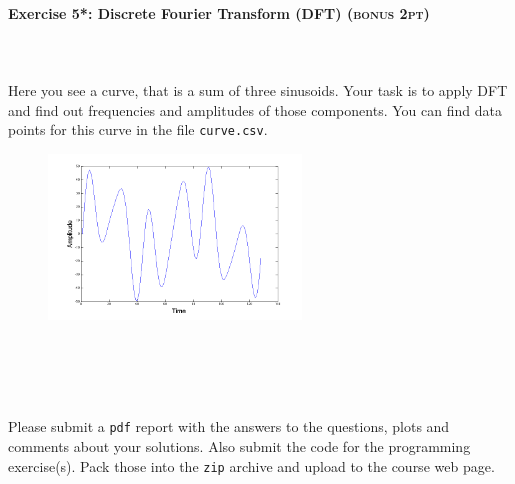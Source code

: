\documentclass[a4paper,11pt]{article}
\newenvironment{exercise}[3]{\paragraph{Exercise #1: #2 \textsc{(#3pt)}}\ \\}{
\medskip}
\begin{document}
\begin{exercise}{5*}{Discrete Fourier Transform (DFT)}{bonus 2}
\ \\
Here you see a curve, that is a sum of three sinusoids. Your task is to apply DFT and find out frequencies and amplitudes of those components. You can find data points for this curve in the file \texttt{curve.csv}.
\begin{figure}[htbp]
   \centering
   \includegraphics[width=0.6\textwidth]{dodft.png} 
\end{figure}
\end{exercise}

\ \\
\ \\
\ \\
\ \\
Please submit a \texttt{pdf} report with the answers to the questions, plots and comments about your solutions. Also submit the code for the programming exercise(s). Pack those into the \texttt{zip} archive and upload to the course web page.
\end{document}
